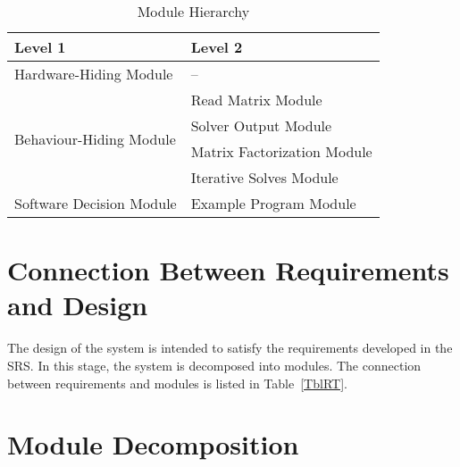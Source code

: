 \documentclass[12pt, titlepage]{article}
\begin{document}
\begin{table}[h!]
  \centering
  \begin{tabular}{p{} p{}}
    \toprule
    \textbf{Level 1}                                            & \textbf{Level 2}                               \\
    \midrule
    {Hardware-Hiding Module}                              & --                                       \\
    \midrule
    \multirow{4}{0.3\textwidth}{Behaviour-Hiding Module}  & Read Matrix Module                       \\
                                                          & Solver Output Module                     \\
                                                          & Matrix Factorization Module              \\
                                                          & Iterative Solves Module                  \\
    \midrule
    \multirow{1}{0.3\textwidth}{Software Decision Module} & Example Program Module                   \\
    \bottomrule
  \end{tabular}
  \caption{Module Hierarchy}
  \label{TblMH}
\end{table}

\section{Connection Between Requirements and Design} \label{SecConnection}

The design of the system is intended to satisfy the requirements developed in
the SRS. In this stage, the system is decomposed into modules. The connection
between requirements and modules is listed in Table~\ref{TblRT}.


\section{Module Decomposition} \label{SecMD}
\end{document}
